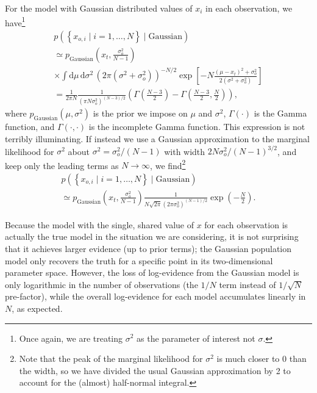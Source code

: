 \documentclass[modern]{aastex631}
\begin{document}
For the model with Gaussian distributed values of $x_i$ in each observation, we
have\footnote{Once again, we are treating $\sigma^2$ as the parameter of
interest not $\sigma$.}
\begin{multline}
    p\left( \left\{ x_{o,i} \mid i = 1, \ldots, N \right\} \mid \mathrm{Gaussian} \right) \\ \simeq p_\mathrm{Gaussian}\left( x_t, \frac{\sigma_o^2}{N-1} \right) \\ \times \int \mathrm{d} \mu \, \mathrm{d} \sigma^2 \, \left( 2 \pi \left( \sigma^2 + \sigma_o^2 \right)\right)^{-N/2} \exp\left[ - N \frac{\left( \mu - x_t \right)^2 + \sigma_o^2}{2 \left( \sigma^2 + \sigma_o^2 \right)} \right] \\ = \frac{1}{2 \pi N} \frac{1}{\left( \pi N \sigma_o^2 \right)^{(N-3)/2}} \left( \Gamma\left(\frac{N-3}{2} \right) - \Gamma\left( \frac{N-3}{2} , \frac{N}{2} \right) \right),
\end{multline}
where $p_\mathrm{Gaussian}\left( \mu, \sigma^2 \right)$ is the prior we impose
on $\mu$ and $\sigma^2$, $\Gamma\left( \cdot \right)$ is the Gamma function, and
$\Gamma\left( \cdot, \cdot \right)$ is the incomplete Gamma function.  This
expression is not terribly illuminating.  If instead we use a Gaussian
approximation to the marginal likelihood for $\sigma^2$ about $\sigma^2 =
\sigma_o^2/\left( N - 1 \right)$ with width $2 N \sigma_o^2 / \left( N - 1
\right)^{3/2}$, and keep only the leading terms as $N \to \infty$, we
find\footnote{Note that the peak of the marginal likelihood for $\sigma^2$ is
much closer to 0 than the width, so we have divided the usual Gaussian
approximation by 2 to account for the (almost) half-normal integral.} 
\begin{multline}
    \label{eq:gaussian-evidence}
    p\left( \left\{ x_{o,i} \mid i = 1, \ldots, N \right\} \mid \mathrm{Gaussian} \right) \\ \simeq p_\mathrm{Gaussian}\left( x_t, \frac{\sigma_o^2}{N-1} \right) \frac{1}{N \sqrt{2\pi} \left( 2 \pi \sigma_o^2 \right)^{(N-1)/2}} \exp\left( -\frac{N}{2} \right).
\end{multline}

Because the model with the single, shared value of $x$ for each observation is
actually the true model in the situation we are considering, it is not
surprising that it achieves larger evidence (up to prior terms); the Gaussian
population model only recovers the truth for a specific point in its
two-dimensional parameter space.  However, the loss of log-evidence from the
Gaussian model is only logarithmic in the number of observations (the $1/N$ term
instead of $1/\sqrt{N}$ pre-factor), while the overall log-evidence for each
model accumulates linearly in $N$, as expected.
\end{document}
